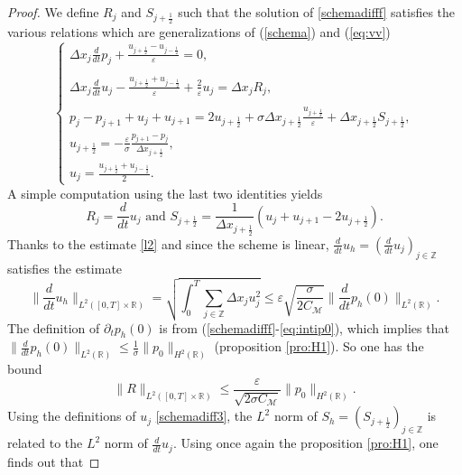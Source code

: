 \documentclass[a4paper,french,english,10pt]{article}
\newcommand\eps{\varepsilon}
\newcommand{\dt}{\partial_t}
\begin{document}
\begin{proof}
We define $R_j$ and $S_{j+\frac12 }$ such that the solution of
\eqref{schemadifff} satisfies the various relations 
which are generalizations of (\ref{schema}) and (\ref{eq:vv}) 
 \begin{equation}\label{schemadiff3}
\left\{
\begin{array}{lll}
\displaystyle 
\Delta x_j\frac{d}{dt} p_j
+\frac{u_{j+\frac12 }-u_{j-\frac12 }}{\eps }=0,\\
\\
\displaystyle 
\Delta x_j\frac{d}{dt} u_j
-\frac{u_{j+\frac12 }+u_{j-\frac12 }}{\eps}+\frac{2}{\eps }u_j=\Delta x_j R_j,\\
\\
\displaystyle 
p_j-p_{j+1}+u_j+u_{j+1} =2u_{j+\frac12 } +\sigma \Delta x_{j+\frac12 }
\frac{u_{j+\frac12 } }{\eps}+\Delta x_{j+\frac12}S_{j+\frac12 } , \\
\displaystyle 
u_{j+\frac12}= -\frac\eps\sigma \frac{p_{j+1}-p_j}{\Delta x_{j+\frac12}}, \\
\displaystyle 
u_j=\frac{u_{j+\frac12}+u_{j-\frac12}}{2}.
\end{array}
\right.
\end{equation}
A simple computation using the  last two identities
yields
\begin{equation*}
R_j= \frac{d}{dt} u_j
\mbox{ and }
S_{j+\frac12 }= \frac1{\Delta x_{j+\frac12} }\left(
u_j+u_{j+1} -2u_{j+\frac12 }\right).
\end{equation*}
Thanks to the estimate \eqref{l2} and since the scheme is linear, $\frac{d}{dt} u_h = (\frac{d}{dt} u_j)_{j\in\mathbb{Z}}$
satisfies the estimate 
$$
\bigg\|\frac{d}{dt} u_h\bigg\|_{L^2([0,T]\times \mathbb{R})} = \sqrt{\int_0^T \sum_{j\in\mathbb{Z}} \Delta x_j u_j^2 }\leq
\eps \sqrt{ \frac{\sigma}{2C_{\mathcal{M}} }} \bigg\|\frac{d}{dt} p_h(0)\bigg\|_{L^2(\mathbb{R})}.
$$
The definition of $\dt p_h(0)$ is from (\ref{schemadifff}-\ref{eq:intip0}),
which
implies that $\|\frac{d}{dt} p_h(0)\|_{L^2(\mathbb{R})}\leq \frac{1}{\sigma} 
\| p_0\|_{H^2(\mathbb{R})}$ (proposition \ref{pro:H1}). So one has the bound
\begin{equation} \label{eq:p5}
\|R\|_{L^2([0,T]\times \mathbb{R})}\leq   \frac{\eps }{ \sqrt{ 2\sigma C_{\mathcal{M}} } } 
\| p_0\|_{H^2(\mathbb{R})}.
\end{equation}
Using the definitions of $u_j$ \eqref{schemadiff3}, the $L^2$ norm of $S_h = (S_{j+\frac12})_{j\in\mathbb{Z}}$ is related to the $L^2$ norm of $\frac{d}{dt}u_j$. Using once again the proposition \ref{pro:H1}, one finds out that 

\end{proof}
\end{document}
